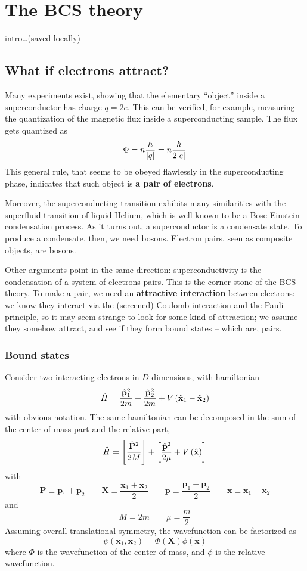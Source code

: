 \chapter{The BCS theory}\chaptertoc{}\label{chap: the bcs theory}

{\color{red}intro\dots (saved locally)}

\section{What if electrons attract?}

Many experiments exist, showing that the elementary ``object'' inside a superconductor has charge $q=2e$. This can be verified, for example, measuring the quantization of the magnetic flux inside a superconducting sample. The flux gets quantized as
\[
	\Phi = n\frac{h}{\abs{q}} = n \frac{h}{2\abs{e}} 
\]
This general rule, that seems to be obeyed flawlessly in the superconducting phase, indicates that such object is \textbf{a pair of electrons}.

Moreover, the superconducting transition exhibits many similarities with the superfluid transition of liquid Helium, which is well known to be a Bose-Einstein condensation process. As it turns out, a superconductor is a condensate state. To produce a condensate, then, we need bosons. Electron pairs, seen as composite objects, are bosons.

Other arguments point in the same direction: superconductivity is the condensation of a system of electrons pairs. This is the corner stone of the BCS theory. To make a pair, we need an \textbf{attractive interaction} between electrons: we know they interact via the (screened) Coulomb interaction and the Pauli principle, so it may seem strange to look for some kind of attraction; we assume they somehow attract, and see if they form bound states -- which are, pairs.

\subsection{Bound states}

Consider two interacting electrons in $D$ dimensions, with hamiltonian
\[
	\hat H = \frac{\hat{\mathbf{p}}_1^2}{2m} + \frac{\hat{\mathbf{p}}_2^2}{2m} + V\left({\hat{\mathbf{x}}_1-\hat{\mathbf{x}}_2}\right)
\]
with obvious notation. The same hamiltonian can be decomposed in the sum of the center of mass part and the relative part,
\[
	\hat H = \left[{\frac{\hat{\mathbf{P}}^2}{2M}}\right] + \left[{\frac{\hat{\mathbf{p}}^2}{2\mu} + V \left({\hat{\mathbf{x}}}\right)}\right]
\]
with
\[
	\mathbf{P} \equiv \mathbf{p}_1 + \mathbf{p}_2
	\qquad
	\mathbf{X} \equiv \frac{\mathbf{x}_1 + \mathbf{x}_2}{2}
	\qquad
	\mathbf{p} \equiv \frac{\mathbf{p}_1 - \mathbf{p}_2}{2}
	\qquad
	\mathbf{x} \equiv \mathbf{x}_1 - \mathbf{x}_2
\]
and
\[
	M = 2m
	\qquad
	\mu = \frac{m}{2}
\]
Assuming overall translational symmetry, the wavefunction can be factorized as
\[
	\psi(\mathbf{x}_1,\mathbf{x}_2) = \Phi(\mathbf{X}) \phi(\mathbf{x})
\]
where $\Phi$ is the wavefunction of the center of mass, and $\phi$ is the relative wavefunction.

